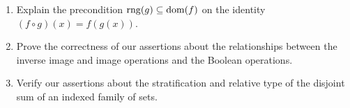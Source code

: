\Exercises

\begin{enumerate}
\item  Explain the precondition  $\mathop{\mathrm{rng}}(g) \subseteq  \mathop{\mathrm{dom}}(f)$ on the identity
  $(f \circ g)(x) = f(g(x))$.

\item Prove the correctness of our assertions about the relationships between
  the inverse image and image operations and the
  Boolean operations.

\item  Verify our assertions about the stratification and
  relative type of the disjoint sum
  of an indexed family of sets.
\end{enumerate}

